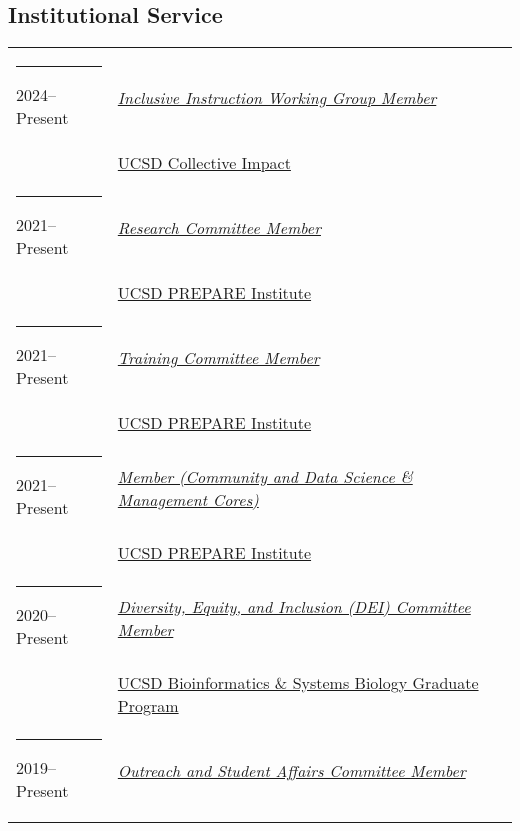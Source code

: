 \documentclass[margin,line]{res}
\begin{document}
\begin{resume}
\section{\sc Institutional Service}
\begin{longtable}{@{}p{0.7in}p{4in}}\rule{-1mm}{4.5mm}
\hspace*{-4mm} 2024--Present & \href{https://collectiveimpact.ucsd.edu/themes-work-groups/students/inclusive.html}{\textit{Inclusive Instruction Working Group Member}}\\*
\hspace*{-4mm} & \hspace{4mm} \href{https://collectiveimpact.ucsd.edu/}{UCSD Collective Impact}\\
\hspace*{-4mm} \rule{-1mm}{5mm} 2021--Present & \href{https://prepare.ucsd.edu/cores/}{\textit{Research Committee Member}}\\*
\hspace*{-4mm} & \hspace{4mm} \href{https://prepare.ucsd.edu/}{UCSD PREPARE Institute}\\
\hspace*{-4mm} \rule{-1mm}{5mm} 2021--Present & \href{https://prepare.ucsd.edu/cores/}{\textit{Training Committee Member}}\\*
\hspace*{-4mm} & \hspace{4mm} \href{https://prepare.ucsd.edu/}{UCSD PREPARE Institute}\\
\hspace*{-4mm} \rule{-1mm}{5mm} 2021--Present & \href{https://prepare.ucsd.edu/cores/}{\textit{Member (Community and Data Science \& Management Cores)}}\\*
\hspace*{-4mm} & \hspace{4mm} \href{https://prepare.ucsd.edu/}{UCSD PREPARE Institute}\\
\hspace*{-4mm} \rule{-1mm}{5mm} 2020--Present & \href{https://bioinformatics.ucsd.edu/node/3/}{\textit{Diversity, Equity, and Inclusion (DEI) Committee Member}}\\*
\hspace*{-4mm} & \hspace{4mm} \href{https://bioinformatics.ucsd.edu/}{UCSD Bioinformatics \& Systems Biology Graduate Program}\\
\hspace*{-4mm} \rule{-1mm}{5mm} 2019--Present & \href{https://bioinformatics.ucsd.edu/node/3/}{\textit{Outreach and Student Affairs Committee Member}}\\*

\end{longtable}
\end{resume}
\end{document}
